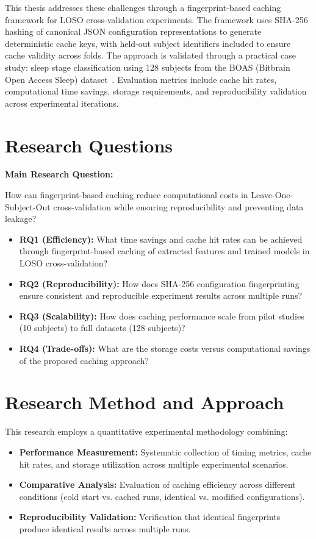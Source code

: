 \documentclass{imc-inf} %
\begin{document}
This thesis addresses these challenges through a fingerprint-based caching 
framework for LOSO cross-validation experiments. The framework uses SHA-256 
hashing of canonical JSON configuration representations to generate deterministic 
cache keys, with held-out subject identifiers included to ensure cache validity 
across folds. The approach is validated through a practical case study: sleep 
stage classification using 128 subjects from the BOAS (Bitbrain Open Access 
Sleep) dataset~\cite{kemp2000sleepEDF,goldberger2000physionet}. Evaluation 
metrics include cache hit rates, computational time savings, storage requirements, 
and reproducibility validation across experimental iterations.


\section{Research Questions}

\textbf{Main Research Question:}

How can fingerprint-based caching reduce computational costs in Leave-One-Subject-Out cross-validation while ensuring reproducibility and preventing data leakage?

\begin{itemize}
\item \textbf{RQ1 (Efficiency):} What time savings and cache hit rates can be achieved through fingerprint-based caching of extracted features and trained models in LOSO cross-validation?
\item \textbf{RQ2 (Reproducibility):} How does SHA-256 configuration fingerprinting ensure consistent and reproducible experiment results across multiple runs?
\item \textbf{RQ3 (Scalability):} How does caching performance scale from pilot studies (10 subjects) to full datasets (128 subjects)?
\item \textbf{RQ4 (Trade-offs):} What are the storage costs versus computational savings of the proposed caching approach?
\end{itemize}



\section{Research Method and Approach}
This research employs a quantitative experimental methodology combining:

\begin{itemize}
\item \textbf{Performance Measurement:} Systematic collection of timing metrics, cache hit rates, and storage utilization across multiple experimental scenarios.
\item \textbf{Comparative Analysis:} Evaluation of caching efficiency across different conditions (cold start vs. cached runs, identical vs. modified configurations).
\item \textbf{Reproducibility Validation:} Verification that identical fingerprints produce identical results across multiple runs.
\end{itemize}
\end{document}
